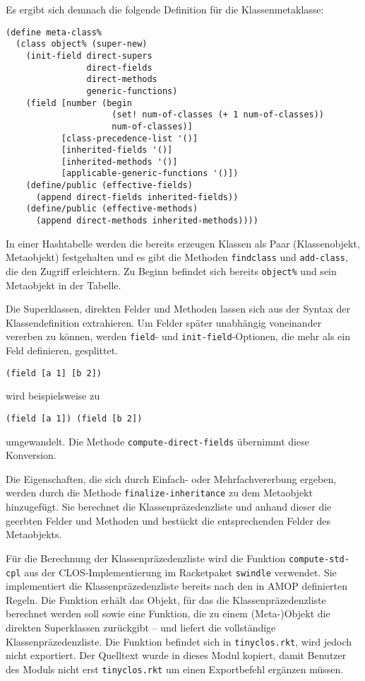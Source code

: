 Es ergibt sich demnach die folgende Definition für die Klassenmetaklasse:

\begin{lstlisting}
(define meta-class%
  (class object% (super-new)
    (init-field direct-supers
                direct-fields
                direct-methods
                generic-functions)
    (field [number (begin 
                     (set! num-of-classes (+ 1 num-of-classes))
                     num-of-classes)]
           [class-precedence-list '()]
           [inherited-fields '()]
           [inherited-methods '()]
           [applicable-generic-functions '()])    
    (define/public (effective-fields)
      (append direct-fields inherited-fields))
    (define/public (effective-methods)
      (append direct-methods inherited-methods))))
\end{lstlisting}

In einer Hashtabelle werden die bereits erzeugen Klassen als Paar (Klassenobjekt, Metaobjekt) festgehalten und es gibt die Methoden \texttt{findclass} und \texttt{add-class}, die den Zugriff erleichtern. Zu Beginn befindet sich bereits \texttt{object\%} und sein Metaobjekt in der Tabelle.

Die Superklassen, direkten Felder und Methoden lassen sich aus der Syntax der Klassendefinition extrahieren. Um Felder später unabhängig voneinander vererben zu können, werden \texttt{field}- und \texttt{init-field}-Optionen, die mehr als ein Feld definieren, gesplittet. 

\texttt{(field [a 1] [b 2])}

wird beispielsweise zu

\texttt{(field [a 1]) (field [b 2])}

umgewandelt. Die Methode \texttt{compute-direct-fields} übernimmt diese Konversion.

Die Eigenschaften, die sich durch Einfach- oder Mehrfachvererbung ergeben, werden durch die Methode \texttt{finalize-inheritance} zu dem Metaobjekt hinzugefügt. Sie berechnet die Klassenpräzedenzliste und anhand dieser die geerbten Felder und Methoden und bestückt die entsprechenden Felder des Metaobjekts.

Für die Berechnung der Klassenpräzedenzliste wird die Funktion \texttt{compute-std-cpl} aus der CLOS-Implementierung im Racketpaket \texttt{swindle} verwendet. Sie implementiert die Klassenpräzedenzliste bereits nach den in AMOP definierten Regeln. Die Funktion erhält das Objekt, für das die Klassenpräzedenzliste berechnet werden soll  sowie eine Funktion, die zu einem (Meta-)Objekt die direkten Superklassen zurückgibt -- und liefert die vollständige Klassenpräzedenzliste. Die Funktion befindet sich in \texttt{tinyclos.rkt}, wird jedoch nicht exportiert. Der Quelltext wurde in dieses Modul kopiert, damit Benutzer des Moduls nicht erst \texttt{tinyclos.rkt} um einen Exportbefehl ergänzen müssen. 

